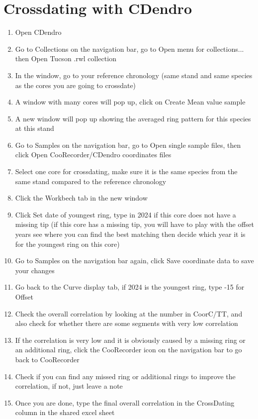 \documentclass[11pt,letter]{article}
\begin{document}
\section{Crossdating with CDendro}
\begin{enumerate}
\item Open CDendro
\item Go to Collections on the navigation bar, go to Open menu for collections... then Open Tucson .rwl collection
\item In the window, go to your reference chronology (same stand and same species as the cores you are going to crossdate)
\item A window with many cores will pop up, click on Create Mean value sample
\item A new window will pop up showing the averaged ring pattern for this species at this stand
\item Go to Samples on the navigation bar, go to Open single sample files, then click Open CooRecorder/CDendro coordinates files
\item Select one core for crossdating, make sure it is the same species from the same stand compared to the reference chronology
\item Click the Workbech tab in the new window
\item Click Set date of youngest ring, type in 2024 if this core does not have a missing tip (if this core has a missing tip, you will have to play with the offset years see where you can find the best matching then decide which year it is for the youngest ring on this core)
\item Go to Samples on the navigation bar again, click Save coordinate data to save your changes
\item Go back to the Curve display tab, if 2024 is the youngest ring, type -15 for Offset
\item Check the overall correlation by looking at the number in CoorC/TT,  and also check for whether there are some segments with very low correlation
\item If the correlation is very low and it is obviously caused by a missing ring or an additional ring, click the CooRecorder icon on the navigation bar to go back to CooRecorder
\item Check if you can find any missed ring or additional rings to improve the correlation, if not, just leave a note
\item Once you are done, type the final overall correlation in the CrossDating column in the shared excel sheet
	\end{enumerate}
\end{document}
